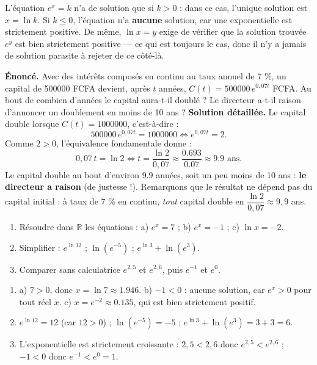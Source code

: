\documentclass[11pt]{article}
\begin{document}
\begin{attention}
L'équation $e^{x}=k$ n'a de solution que si $k>0$ : dans ce cas, l'unique solution est $x=\ln k$. Si $k\leq 0$, l'équation n'a \textbf{aucune} solution, car une exponentielle est strictement positive. De même, $\ln x = y$ exige de vérifier que la solution trouvée $e^{y}$ est bien strictement positive — ce qui est toujours le cas, donc il n'y a jamais de solution parasite à rejeter de ce côté-là.
\end{attention}

\begin{exoresolu}
\textbf{Énoncé.} Avec des intérêts composés en continu au taux annuel de 7 \%, un capital de \num{500000} FCFA devient, après $t$ années, $C(t)=\num{500000}\,e^{0{,}07t}$ FCFA. Au bout de combien d'années le capital aura-t-il doublé ? Le directeur a-t-il raison d'annoncer un doublement en moins de 10 ans ?
\tcblower
\textbf{Solution détaillée.} Le capital double lorsque $C(t)=\num{1000000}$, c'est-à-dire :
\[ \num{500000}\,e^{0{,}07t}=\num{1000000} \iff e^{0{,}07t}=2. \]
Comme $2>0$, l'équivalence fondamentale donne :
\[ 0{,}07\,t=\ln 2 \iff t=\frac{\ln 2}{0{,}07}\approx \frac{\num{0,693}}{\num{0,07}}\approx \num{9,9} \text{ ans}. \]
Le capital double au bout d'environ $\num{9,9}$ années, soit un peu moins de 10 ans : \textbf{le directeur a raison} (de justesse !). Remarquons que le résultat ne dépend pas du capital initial : à taux de 7 \% en continu, \emph{tout} capital double en $\dfrac{\ln 2}{0{,}07}\approx 9{,}9$ ans.
\end{exoresolu}

\begin{exercice}
\begin{enumerate}
\item Résoudre dans $\mathbb{R}$ les équations : a) $e^{x}=7$ ; b) $e^{x}=-1$ ; c) $\ln x = -2$.
\item Simplifier : $e^{\ln 12}$ ; $\ln(e^{-5})$ ; $e^{\ln 3}+\ln(e^{3})$.
\item Comparer sans calculatrice $e^{2{,}5}$ et $e^{2{,}6}$, puis $e^{-1}$ et $e^{0}$.
\end{enumerate}
\end{exercice}

\begin{corrige}
\begin{enumerate}
\item a) $7>0$, donc $x=\ln 7\approx \num{1,946}$. b) $-1<0$ : aucune solution, car $e^{x}>0$ pour tout réel $x$. c) $x=e^{-2}\approx \num{0,135}$, qui est bien strictement positif.
\item $e^{\ln 12}=12$ (car $12>0$) ; $\ln(e^{-5})=-5$ ; $e^{\ln 3}+\ln(e^{3})=3+3=6$.
\item L'exponentielle est strictement croissante : $2{,}5<2{,}6$ donc $e^{2{,}5}<e^{2{,}6}$ ; $-1<0$ donc $e^{-1}<e^{0}=1$.
\end{enumerate}
\end{corrige}
\end{document}
